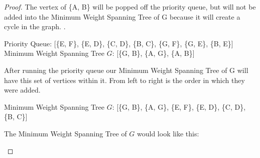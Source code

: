 \documentclass[11pt]{article}
\theoremstyle{definition}
\theoremstyle{definition}
\theoremstyle{definition}
\begin{document}
\begin{proof}
The vertex of \{A, B\} will be popped off the priority queue, but will not be added into the Minimum Weight Spanning Tree of G because it will create a cycle in the graph. . \\
\begin{center}
Priority Queue: [\{E, F\}, \{E, D\}, \{C, D\}, \{B, C\}, \{G, F\}, \{G, E\}, \{B, E\}]\\
Minimum Weight Spanning Tree $G$: [\{G, B\}, \{A, G\}, \{A, B\}] \\
\end{center}

After running the priority queue our Minimum Weight Spanning Tree of G will have this set of vertices within it. From left to right is the order in which they were added. \\
\begin{center}
Minimum Weight Spanning Tree $G$: [\{G, B\}, \{A, G\}, \{E, F\}, \{E, D\}, \{C, D\}, \{B, C\}]
\end{center}
The Minimum Weight Spanning Tree of $G$ would look like this:
\begin {center}
\end{center}
\end{proof}


\newpage
\end{document}

